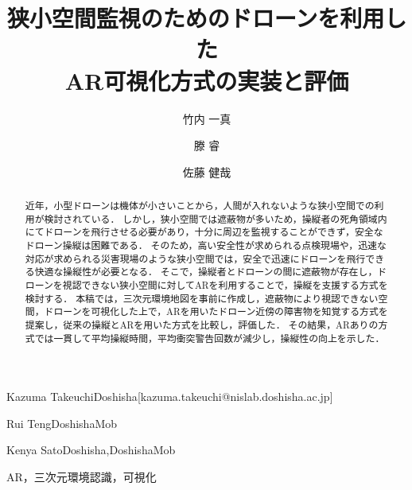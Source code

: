 \documentclass[submit, sigrecommended]{ipsj}
\begin{document}
\title{狭小空間監視のためのドローンを利用した\\ AR可視化方式の実装と評価}




\author{竹内 一真}{Kazuma Takeuchi}{Doshisha}[kazuma.takeuchi@nislab.doshisha.ac.jp]
\author{滕 睿}{Rui Teng}{DoshishaMob}
\author{佐藤 健哉}{Kenya Sato}{Doshisha,DoshishaMob}

\begin{abstract}
近年，小型ドローンは機体が小さいことから，人間が入れないような狭小空間での利用が検討されている．
しかし，狭小空間では遮蔽物が多いため，操縦者の死角領域内にてドローンを飛行させる必要があり，十分に周辺を監視することができず，安全なドローン操縦は困難である．
そのため，高い安全性が求められる点検現場や，迅速な対応が求められる災害現場のような狭小空間では，安全で迅速にドローンを飛行できる快適な操縦性が必要となる．
そこで，操縦者とドローンの間に遮蔽物が存在し，ドローンを視認できない狭小空間に対してARを利用することで，操縦を支援する方式を検討する．
本稿では，三次元環境地図を事前に作成し，遮蔽物により視認できない空間，ドローンを可視化した上で，ARを用いたドローン近傍の障害物を知覚する方式を提案し，従来の操縦とARを用いた方式を比較し，評価した．
その結果，ARありの方式では一貫して平均操縦時間，平均衝突警告回数が減少し，操縦性の向上を示した．
\end{abstract}

\begin{jkeyword}
AR，三次元環境認識，可視化
\end{jkeyword}
\end{document}
